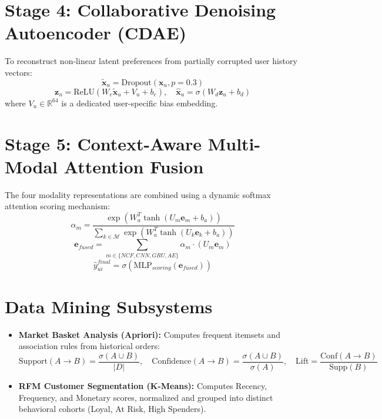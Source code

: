 \documentclass[12pt,a4paper,oneside]{report}
\begin{document}
\section{Stage 4: Collaborative Denoising Autoencoder (CDAE)}
To reconstruct non-linear latent preferences from partially corrupted user history vectors:
\begin{equation}
    \tilde{\mathbf{x}}_u = \text{Dropout}(\mathbf{x}_u, p=0.3)
\end{equation}
\begin{equation}
    \mathbf{z}_u = \text{ReLU}(W_e \tilde{\mathbf{x}}_u + V_u + b_e), \quad \hat{\mathbf{x}}_u = \sigma(W_d \mathbf{z}_u + b_d)
\end{equation}
where $V_u \in \mathbb{R}^{64}$ is a dedicated user-specific bias embedding.

\section{Stage 5: Context-Aware Multi-Modal Attention Fusion}
The four modality representations are combined using a dynamic softmax attention scoring mechanism:
\begin{equation}
    \alpha_m = \frac{\exp(W_a^T \tanh(U_m \mathbf{e}_m + b_a))}{\sum_{k \in \mathcal{M}} \exp(W_a^T \tanh(U_k \mathbf{e}_k + b_a))}
\end{equation}
\begin{equation}
    \mathbf{e}_{fused} = \sum_{m \in \{NCF, CNN, GRU, AE\}} \alpha_m \cdot (U_m \mathbf{e}_m)
\end{equation}
\begin{equation}
    \hat{y}_{ui}^{final} = \sigma \left( \text{MLP}_{scoring}(\mathbf{e}_{fused}) \right)
\end{equation}

\section{Data Mining Subsystems}
\begin{itemize}
    \item \textbf{Market Basket Analysis (Apriori):} Computes frequent itemsets and association rules from historical orders:
    \begin{equation}
        \text{Support}(A \rightarrow B) = \frac{\sigma(A \cup B)}{|D|}, \quad \text{Confidence}(A \rightarrow B) = \frac{\sigma(A \cup B)}{\sigma(A)}, \quad \text{Lift} = \frac{\text{Conf}(A \rightarrow B)}{\text{Supp}(B)}
    \end{equation}
    \item \textbf{RFM Customer Segmentation (K-Means):} Computes Recency, Frequency, and Monetary scores, normalized and grouped into distinct behavioral cohorts (Loyal, At Risk, High Spenders).
\end{itemize}
\end{document}
